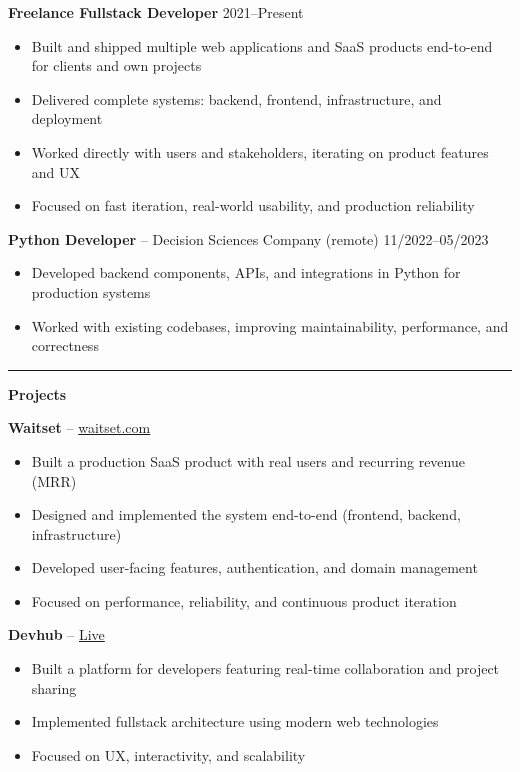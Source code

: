 \documentclass[11pt,a4paper]{article}
\begin{document}
\textbf{Freelance Fullstack Developer} \hfill 2021--Present
\begin{itemize}
\item Built and shipped multiple web applications and SaaS products end-to-end for clients and own projects
\item Delivered complete systems: backend, frontend, infrastructure, and deployment
\item Worked directly with users and stakeholders, iterating on product features and UX
\item Focused on fast iteration, real-world usability, and production reliability
\end{itemize}

\textbf{Python Developer} -- Decision Sciences Company (remote) \hfill 11/2022--05/2023
\begin{itemize}
\item Developed backend components, APIs, and integrations in Python for production systems
\item Worked with existing codebases, improving maintainability, performance, and correctness
\end{itemize}

\rule{\textwidth}{0.5pt}

\textbf{Projects}

\textbf{Waitset} -- \href{https://waitset.com}{waitset.com}
\begin{itemize}
\item Built a production SaaS product with real users and recurring revenue (MRR)
\item Designed and implemented the system end-to-end (frontend, backend, infrastructure)
\item Developed user-facing features, authentication, and domain management
\item Focused on performance, reliability, and continuous product iteration
\end{itemize}

\textbf{Devhub} -- \href{https://devhub.dominikkrakowiak.com}{Live}
\begin{itemize}
\item Built a platform for developers featuring real-time collaboration and project sharing
\item Implemented fullstack architecture using modern web technologies
\item Focused on UX, interactivity, and scalability
\end{itemize}
\end{document}
